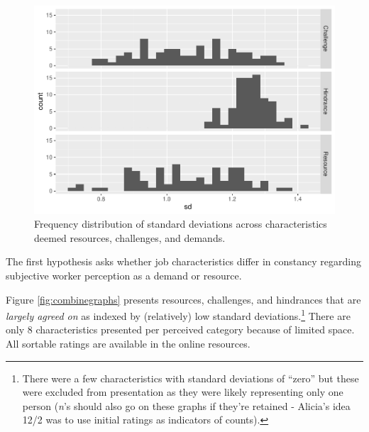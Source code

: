 \documentclass[
  english,
  man]{apa6}
\begin{document}
\begin{figure}
\centering
\includegraphics{Submission_files/figure-latex/overallhist-1.pdf}
\caption{\label{fig:overallhist}Frequency distribution of standard deviations across characteristics deemed resources, challenges, and demands.}
\end{figure}

The first hypothesis asks whether job characteristics differ in constancy regarding subjective worker perception as a demand or resource.

Figure \ref{fig:combinegraphs} presents resources, challenges, and hindrances that are \emph{largely agreed on} as indexed by (relatively) low standard deviations.\footnote{There were a few characteristics with standard deviations of ``zero'' but these were excluded from presentation as they were likely representing only one person (\emph{n}'s should also go on these graphs if they're retained - Alicia's idea 12/2 was to use initial ratings as indicators of counts).} There are only 8 characteristics presented per perceived category because of limited space. All sortable ratings are available in the online resources.
\end{document}
